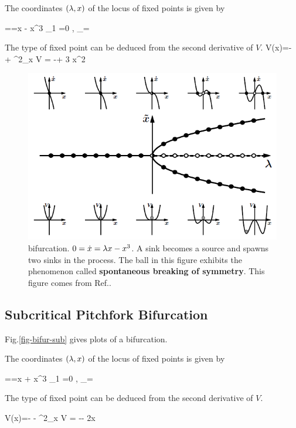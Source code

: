 The coordinates $(\lambda, x)$ of the locus 
of fixed points is given by

==\lam x  - x^3
\implies {}_1 =0
\;,\;\;
_\pm = \pm \sqrt{\lam}
\eeq

 The type of
 fixed point can be 
 deduced from the second derivative
 of $V$.
\beq
V(x)=-\lam {} 
+ 
\implies \partial^2_x V = -\lam + 3 x^2
\eeq

\begin{figure}[h!]
 \centering
 \includegraphics[width=5in]
 {dynamical-sys/bifur-super.png}
 \caption{\supercri bifurcation. 
 $0=\dot{x}=\lambda x  - x^3$.
 A sink becomes a source and spawns two sinks
 in the process.
 The ball in this 
 figure exhibits
 the phenomenon called 
 {\bf spontaneous breaking of symmetry}. This
 figure  comes from Ref.\cite{dynamical-fuchs}.}
 \label{fig-bifur-super}
\end{figure}
 
\subsection{Subcritical
Pitchfork Bifurcation}

Fig.\ref{fig-bifur-sub} gives plots of a \subcri
bifurcation.

The coordinates $(\lambda, x)$ of the locus 
of fixed points is given by


==\lam x  + x^3
\implies {}_1 =0
\;,\;\;
_\pm = \pm \sqrt{-\lam}
\eeq

 The type of
 fixed point can be 
 deduced from the second derivative
 of $V$.
 
\beq
V(x)=-\lam {} 
- 
\implies \partial^2_x V = -\lam - 2x
\eeq

